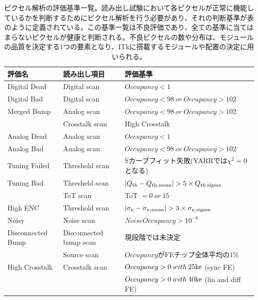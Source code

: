 \begin{table}[tbp]
\begin{center}
\caption[ピクセル解析の評価基準一覧]{ピクセル解析の評価基準一覧\cite{3-1}。読み出し試験において各ピクセルが正常に機能しているかを判断するためにピクセル解析を行う必要があり、それの判断基準が表のように定義されている。この基準一覧は不良評価であり、全ての基準に当てはまらないピクセルが健康と判断される。不良ピクセルの数や分布は、モジュールの品質を決定する1つの要素となり、ITkに搭載するモジュールや配置の決定に用いられる。}
\label{pixel_analysis_criteria}
  \scriptsize
  \begin{tabular}{|lll|} \hline
    評価名 & 読み出し項目 & 評価基準 \\ \hline
    Digital Dead      & Digital scan           & $Occupancy < 1$ \\ \hline
    Digital Bad       & Digital scan           & $Occupancy < 98 \: or \: Occupancy > 102$ \\\hline 
    Merged Bump       & Analog scan            & $Occupancy < 98 \: or \: Occupancy > 102$  \\ 
                      & Crosstalk scan         & High Crosstalk\\ \hline
    Analog Dead       & Analog scan            & $Occupancy < 1$ \\ \hline
    Analog Bad        & Analog scan            & $Occupancy < 98 \: or \: Occupancy > 102$ \\ \hline
    Tuning Failed     & Threshold scan         & Sカーブフィット失敗(YARRでは$\chi^2=0$となる) \\ \hline
    Tuning Bad        & Thresheld scan         & $|Q_{\rm th}-Q_{\rm th,mean}| > 5 \times Q_{\rm th,sigma}$ \\ 
                      & ToT scan               & ToT $ = 0 \: or \: 15 $\\ \hline
    High ENC          & Threshold scan         & $|\sigma_{\rm n}-\sigma_{\rm n,mean}| > 3 \times \sigma_{\rm n,sigma}$\\ \hline
    Noisy             & Noise scan             & $NoiseOccupancy > 10^{-6}$\\ \hline
    Disconnected Bump & Disconnected bump scan & 現段階では未決定 \\ 
                      & Source scan            & $Occupancy$がFEチップ全体平均の$1\%$ \\ \hline
    High Crosstalk    & Crosstalk scan         & $Occupancy>0 \: with \: 25{\rm ke}$ (sync FE)\\
                      &                        & $Occupancy>0 \: with \: 40{\rm ke}$ (lin and diff FE)\\ \hline 
  \end{tabular}
\end{center}
\end{table}

